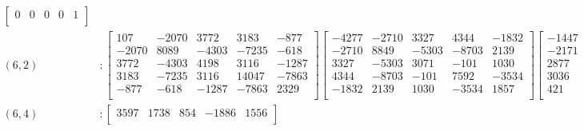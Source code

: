 \documentclass[12pt]{amsart}
\theoremstyle{plain}
\theoremstyle{definition}
\begin{document}
\begin{landscape}
\begin{align*}
\begin{bmatrix}
 0  &   0  &   0  &   0  &   1  \\ 
\end{bmatrix}
\\
(6,2) &:
\begin{bmatrix}
107  &   -2070  &   3772  &   3183  &   -877  \\ 
 -2070  &   8089  &   -4303  &   -7235  &   -618  \\ 
 3772  &   -4303  &   4198  &   3116  &   -1287  \\ 
 3183  &   -7235  &   3116  &   14047  &   -7863  \\ 
 -877  &   -618  &   -1287  &   -7863  &   2329  \\ 
\end{bmatrix}
\begin{bmatrix}
-4277  &   -2710  &   3327  &   4344  &   -1832  \\ 
 -2710  &   8849  &   -5303  &   -8703  &   2139  \\ 
 3327  &   -5303  &   3071  &   -101  &   1030  \\ 
 4344  &   -8703  &   -101  &   7592  &   -3534  \\ 
 -1832  &   2139  &   1030  &   -3534  &   1857  \\ 
\end{bmatrix}
\begin{bmatrix}
-1447  &   -2171  &   2877  &   3036  &   421  \\ 
 -2171  &   5216  &   -5624  &   -9508  &   3094  \\ 
 2877  &   -5624  &   3276  &   1240  &   412  \\ 
 3036  &   -9508  &   1240  &   9665  &   -3864  \\ 
 421  &   3094  &   412  &   -3864  &   1092  \\ 
\end{bmatrix}
\begin{bmatrix}
-1259  &   3134  &   -1777  &   -2214  &   242  \\ 
 3134  &   -8458  &   4713  &   7395  &   -1530  \\ 
 -1777  &   4713  &   -3821  &   -1799  &   -375  \\ 
 -2214  &   7395  &   -1799  &   -13222  &   5135  \\ 
 242  &   -1530  &   -375  &   5135  &   -2426  \\ 
\end{bmatrix}
\\
(6,4) &:
\begin{bmatrix}
3597  &   1738  &   854  &   -1886  &   1556  \\ 

\end{bmatrix}
\end{align*}
\end{landscape}
\end{document}
